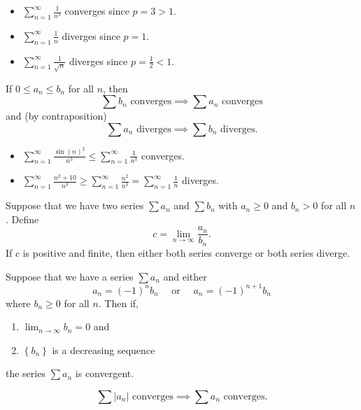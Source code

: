 \begin{itemize}
\item $\displaystyle \sum_{n=1}^\infty \frac{1}{n^3}$ converges since $p=3>1$.
\item $\displaystyle \sum_{n=1}^\infty \frac{1}{n}$ diverges since $p=1$.
\item $\displaystyle \sum_{n=1}^\infty \frac{1}{\sqrt{n}}$ diverges since $p=\frac{1}{2}<1$.
\end{itemize}


\begin{thm}
If $0\leq a_n\leq b_n$ for all $n$, then
$$\sum b_n\text{ converges}\implies \sum a_n\text{ converges}$$
and (by contraposition)
$$\sum a_n\text{ diverges}\implies \sum b_n\text{ diverges}.$$
\end{thm}


\begin{itemize}
\item $\displaystyle \sum_{n=1}^\infty \frac{\sin(n)^2}{n^3} \leq \sum_{n=1}^\infty \frac{1}{n^3}$ converges.
\item $\displaystyle \sum_{n=1}^\infty \frac{n^2+10}{n^3} \geq \sum_{n=1}^\infty \frac{n^2}{n^3}=\sum_{n=1}^\infty \frac{1}{n}$ diverges.
\end{itemize}



\begin{thm}
Suppose that we have two series $\sum a_n$ and $\sum b_n$ with $a_n\geq 0$ and $b_n > 0$ for all $n$. Define
$$c=\lim_{n\to\infty}\frac{a_n}{b_n}.$$
If $c$ is positive and finite, then either both series converge or both series diverge.
\end{thm}



\begin{thm}
Suppose that we have a series $\sum a_{n}$ and either $$a_{n}=(-1)^{n} b_{n}\quad\text{ or }\quad  a_{n}=(-1)^{n+1} b_{n}$$ where $b_{n} \geq 0$ for all $n .$ Then if,
\begin{enumerate}
    \item $\displaystyle\lim _{n \to \infty} b_{n}=0$ and
    \item $\left\{b_{n}\right\}$ is a decreasing sequence
\end{enumerate}
the series $\sum a_{n}$ is convergent.
\end{thm}



\begin{thm}
$$\sum |a_n| \text{ converges}\implies \sum a_n\text{ converges}.$$
\end{thm}

